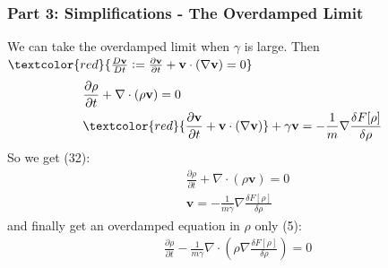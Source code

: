 \documentclass[aspectratio=169,xcolor=dvipsnames]{beamer}
\begin{document}
\begin{frame}
	\frametitle{Part 3: Simplifications - The Overdamped Limit}
	We can take the overdamped limit when $\gamma$ is large.
	Then $\textcolor{red}{\frac{D \mathbf{v}}{D t} := \frac{\partial \mathbf{v}}{\partial t} + \mathbf{v} \cdot \left(\nabla \mathbf{v}\right) = 0}$
	\begin{align*}
	&\frac{\partial \rho}{\partial t} + \nabla \cdot \left(\rho \mathbf{v}\right) = 0 \\
	&\textcolor{red}{\frac{\partial \mathbf{v}}{\partial t} + \mathbf{v} \cdot \left(\nabla \mathbf{v}\right)} + \gamma \mathbf{v} = - \frac{1}{m}  \nabla \frac{\delta {F}[\rho]}{\delta \rho}
	\end{align*}
	So we get (32):
	\begin{align*}
	&\frac{\partial \rho}{\partial t} + \nabla \cdot \left(\rho \mathbf{v}\right) = 0 \\
	&\mathbf{v} = - \frac{1}{m \gamma} \nabla \frac{\delta F [\rho]}{\delta \rho}\textbf{}
	\end{align*}
	and finally get an overdamped equation in $\rho$ only (5):
	\begin{align*}
	&\frac{\partial \rho}{\partial t} -\frac{1}{m \gamma}  \nabla \cdot \left(\rho \nabla \frac{\delta {F}[\rho]}{\delta \rho}\textbf{}\right) = 0 
	\end{align*}
\end{frame}
\end{document}
